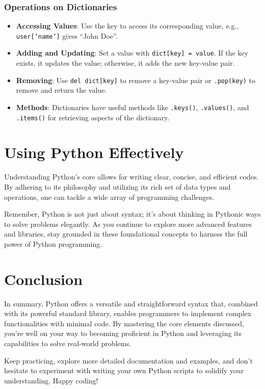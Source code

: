 \documentclass{article}
\begin{document}
\subsubsection{Operations on Dictionaries}

\begin{itemize}
    \item \textbf{Accessing Values}: Use the key to access its corresponding value, e.g., \texttt{user['name']} gives ``John Doe''.
    \item \textbf{Adding and Updating}: Set a value with \texttt{dict[key] = value}. If the key exists, it updates the value; otherwise, it adds the new key-value pair.
    \item \textbf{Removing}: Use \texttt{del dict[key]} to remove a key-value pair or \texttt{.pop(key)} to remove and return the value.
    \item \textbf{Methods}: Dictionaries have useful methods like \texttt{.keys()}, \texttt{.values()}, and \texttt{.items()} for retrieving aspects of the dictionary.
\end{itemize}

\section{Using Python Effectively}

Understanding Python’s core allows for writing clear, concise, and efficient codes. By adhering to its philosophy and utilizing its rich set of data types and operations, one can tackle a wide array of programming challenges.

Remember, Python is not just about syntax; it's about thinking in Pythonic ways to solve problems elegantly. As you continue to explore more advanced features and libraries, stay grounded in these foundational concepts to harness the full power of Python programming.

\section{Conclusion}

In summary, Python offers a versatile and straightforward syntax that, combined with its powerful standard library, enables programmers to implement complex functionalities with minimal code. By mastering the core elements discussed, you're well on your way to becoming proficient in Python and leveraging its capabilities to solve real-world problems.

Keep practicing, explore more detailed documentation and examples, and don't hesitate to experiment with writing your own Python scripts to solidify your understanding. Happy coding!
\end{document}
